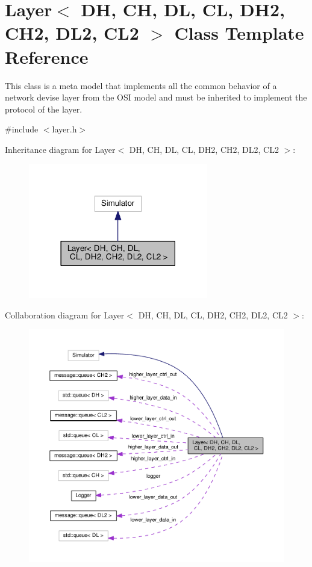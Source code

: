 \hypertarget{classLayer}{}\section{Layer$<$ DH, CH, DL, CL, D\+H2, C\+H2, D\+L2, C\+L2 $>$ Class Template Reference}
\label{classLayer}


This class is a meta model that implements all the common behavior of a network devise layer from the O\+SI model and must be inherited to implement the protocol of the layer.  




{\ttfamily \#include $<$layer.\+h$>$}



Inheritance diagram for Layer$<$ DH, CH, DL, CL, D\+H2, C\+H2, D\+L2, C\+L2 $>$\+:\nopagebreak
\begin{figure}[H]
\begin{center}
\leavevmode
\includegraphics[width=222pt]{classLayer__inherit__graph}
\end{center}
\end{figure}


Collaboration diagram for Layer$<$ DH, CH, DL, CL, D\+H2, C\+H2, D\+L2, C\+L2 $>$\+:\nopagebreak
\begin{figure}[H]
\begin{center}
\leavevmode
\includegraphics[width=350pt]{classLayer__coll__graph}
\end{center}
\end{figure}
